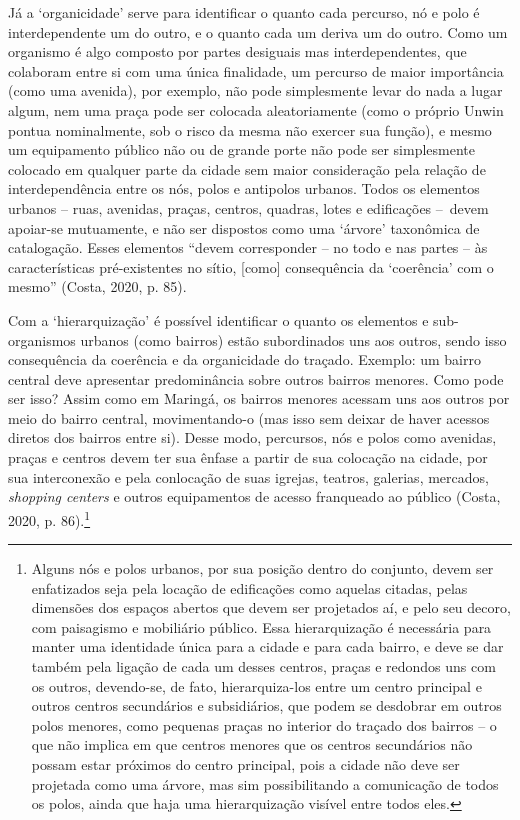 \documentclass[12pt, a4paper]{book} %
\begin{document}
        Já a `organicidade' serve para identificar o quanto cada percurso, nó e polo é interdependente um do outro, e o quanto cada um deriva um do outro. Como um organismo é algo composto por partes desiguais mas interdependentes, que colaboram entre si com uma única finalidade, um percurso de maior importância (como uma avenida), por exemplo, não pode simplesmente levar do nada a lugar algum, nem uma praça pode ser colocada aleatoriamente (como o próprio Unwin pontua nominalmente, sob o risco da mesma não exercer sua função), e mesmo um equipamento público não ou de grande porte não pode ser simplesmente colocado em qualquer parte da cidade sem maior consideração pela relação de interdependência entre os nós, polos e antipolos urbanos. Todos os elementos urbanos – ruas, avenidas, praças, centros, quadras, lotes e edificações – devem apoiar-se mutuamente, e não ser dispostos como uma `árvore' taxonômica de catalogação. Esses elementos ``devem corresponder – no todo e nas partes – às características pré-existentes no sítio, [como] consequência da `coerência' com o mesmo'' (Costa, 2020, p. 85).

        Com a `hierarquização' é possível identificar o quanto os elementos e sub-organismos urbanos (como bairros) estão subordinados uns aos outros, sendo isso consequência da coerência e da organicidade do traçado. Exemplo: um bairro central deve apresentar predominância sobre outros bairros menores. Como pode ser isso? Assim como em Maringá, os bairros menores acessam uns aos outros por meio do bairro central, movimentando-o (mas isso sem deixar de haver acessos diretos dos bairros entre si). Desse modo, percursos, nós e polos como avenidas, praças e centros devem ter sua ênfase a partir de sua colocação na cidade, por sua interconexão e pela conlocação de suas igrejas, teatros, galerias, mercados, \textit{shopping centers} e outros equipamentos de acesso franqueado ao público (Costa, 2020, p. 86).\footnote[25]{Alguns nós e polos urbanos, por sua posição dentro do conjunto, devem ser enfatizados seja pela locação de edificações como aquelas citadas, pelas dimensões dos espaços abertos que devem ser projetados aí, e pelo seu decoro, com paisagismo e mobiliário público. Essa hierarquização é necessária para manter uma identidade única para a cidade e para cada bairro, e deve se dar também pela ligação de cada um desses centros, praças e redondos uns com os outros, devendo-se, de fato, hierarquiza-los entre um centro principal e outros centros secundários e subsidiários, que podem se desdobrar em outros polos menores, como pequenas praças no interior do traçado dos bairros – o que não implica em que centros menores que os centros secundários não possam estar próximos do centro principal, pois a cidade não deve ser projetada como uma árvore, mas sim possibilitando a comunicação de todos os polos, ainda que haja uma hierarquização visível entre todos eles.}
\end{document}
